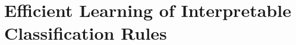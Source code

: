 \documentclass{report}
\begin{document}
			\chapter{Efficient Learning of  Interpretable Classification Rules}
%				
				
				
%				
				
				
				
				
				
				
%				
%				
%				
%				
%				
%				
%				
%			
%
%
%
%
%
%				
\end{document}
